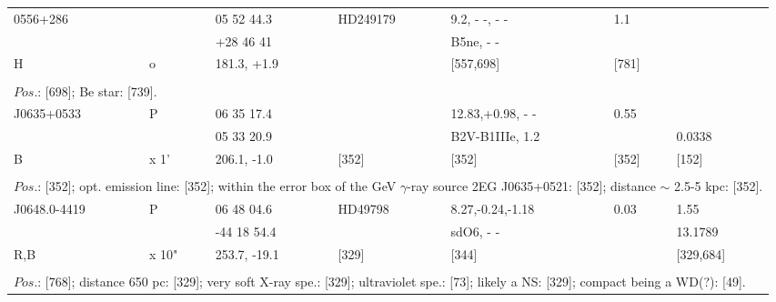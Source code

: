 \documentclass{aa}
\begin{document}
\begin{table*}[h]
\begin{tabular}{p{2.5cm}p{1cm}p{1.8cm}p{2.3cm}p{3.3cm}p{2.0cm}p{2.2cm}}
\noalign{\smallskip}
\hline
\noalign{\smallskip}
 0556+286     &           & 05 52 44.3        & HD249179   & 9.2, - -, - -      &  1.1          &            \\
                        &           & +28 46 41         &                       & B5ne, - -        &                 &           \\
H                     &  o      & 181.3, +1.9       &                        & [557,698]    &  [781]    &           \\
\\
\multicolumn{7}{p{17.5cm}}{
$Pos$.: [698]; Be star: [739].}\\

\noalign{\smallskip}
\hline
\noalign{\smallskip}
J0635+0533  &  P        &  06 35 17.4  &            &    12.83,+0.98, - -    & 0.55            &        \\
                        &             &  05 33 20.9  &            &   B2V-B1IIIe, 1.2   &                      &   0.0338 \\
B                     &  x 1'     & 206.1, -1.0   &  [352]   &        [352]             &  [352]            &   [152] \\
  
\\
\multicolumn{7}{p{17.5cm}}{
$Pos$.: [352];  opt. emission line: [352]; within the error box of the GeV $\gamma$-ray source 
2EG J0635+0521: [352]; distance $\sim$ 2.5-5 kpc: [352].  }\\

\noalign{\smallskip}
\hline
\noalign{\smallskip}
J0648.0-4419 &   P      &   06 48 04.6  & HD49798 & 8.27,-0.24,-1.18   &  0.03      &         1.55        \\
                          &            &  -44 18 54.4  &                   &  sdO6, - -      &                       &        13.1789   \\
R,B                   & x 10"  &  253.7, -19.1  & [329]           &          [344]        &                      &      [329,684]  \\
  
\\
\multicolumn{7}{p{17.5cm}}{
$Pos$.: [768]; distance 650 pc: [329]; very soft X-ray spe.: [329]; ultraviolet spe.: [73]; likely a NS: [329]; 
compact being a WD(?): [49]. }\\


\end{tabular}
\end{table*}
\end{document}
